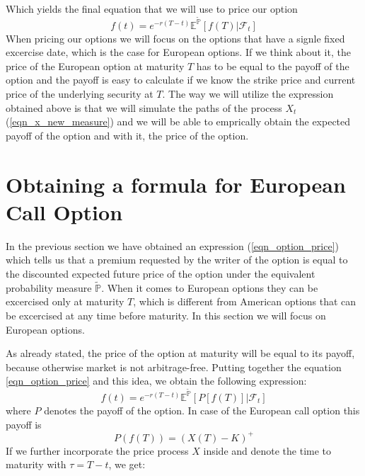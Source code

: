 \documentclass[times, utf8, diplomski]{fer}
\begin{document}
Which yields the final equation that we will use to price our option
\begin{equation} \label{eqn_option_price}
f(t) = e^{-r(T-t)} \mathbb{E}^{\tilde{\mathbb{P}}}[f(T)|\mathcal{F}_t]
\end{equation}
When pricing our options we will focus on the options that have a signle fixed excercise date, which is the case for European options. If we think about it, the price of the European option at maturity $T$ has to be equal to the payoff of the option and the payoff is easy to calculate if we know the strike price and current price of the underlying security at $T$. The way we will utilize the expression obtained above is that we will simulate the paths of the process $X_t$ (\ref{eqn_x_new_measure}) and we will be able to emprically obtain the expected payoff of the option and with it, the price of the option.

\section{Obtaining a formula for European Call Option}
In the previous section we have obtained an expression (\ref{eqn_option_price}) which tells us that a premium requested by the writer of the option is equal to the discounted expected future price of the option under the equivalent probability measure $\tilde{\mathbb{P}}$. When it comes to European options they can be excercised only at maturity $T$, which is different from American options that can be excercised at any time before maturity. In this section we will focus on European options. 

\noindent As already stated, the price of the option at maturity will be equal to its payoff, because otherwise market is not arbitrage-free. Putting together the equation \ref{eqn_option_price} and this idea, we obtain the following expression: 
\begin{equation}
	f(t) = e^{-r(T-t)} \mathbb{E}^{\tilde{\mathbb{P}}}[P[f(T)]|\mathcal{F}_t]
\end{equation} where $P$ denotes the payoff of the option. In case of the European call option this payoff is $$P(f(T)) = (X(T) - K)^+$$ If we further incorporate the price process $X$ inside and denote the time to maturity with $\tau = T - t$, we get:
\end{document}
